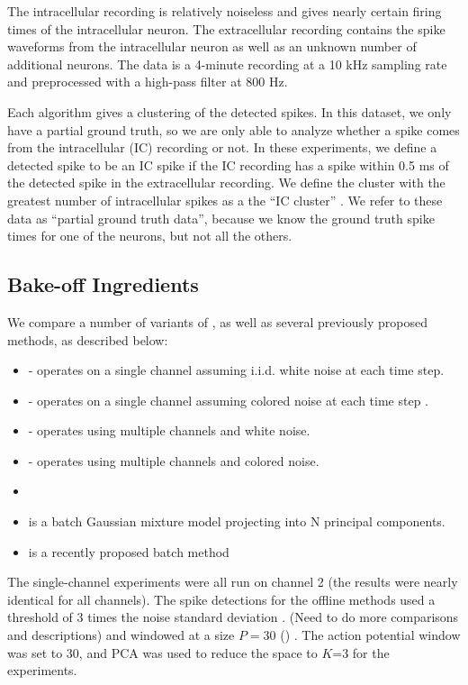 The intracellular recording is relatively noiseless and gives nearly certain firing times of the intracellular neuron.  The extracellular recording contains the spike waveforms from the intracellular neuron as well as an unknown number of additional neurons.  The data is a 4-minute recording at a 10 kHz sampling rate and preprocessed with a high-pass filter at 800 Hz. 

Each algorithm gives a clustering of the detected spikes.  In this dataset, we only have a partial ground truth, so we are only able to analyze whether a spike comes from the intracellular (IC) recording or not.  In these experiments, we define a detected spike to be an IC spike if the IC recording has a spike within 0.5 ms  of the detected spike in the extracellular recording.  We define the cluster with the greatest number of intracellular spikes as a the ``IC cluster'' .   We refer to these data as ``partial ground truth data'', because we know the ground truth spike times for one of the neurons, but not all the others.  

\subsection{Bake-off Ingredients}

We compare a number of variants of \smug, as well as several previously proposed methods, as described below:
\begin{itemize}\itemsep0pt
	\item \smug- operates on a single channel assuming i.i.d. white noise at each time step.
	\item \smug- operates on a single channel assuming colored noise at each time step .
	\item \smug- operates using multiple channels and white noise.
	\item \smug- operates using multiple channels and colored noise.
	\item {}
	\item {} is a batch Gaussian mixture model projecting into N principal components. 
	\item {} is a recently proposed batch method
\end{itemize}
% 
% 
The single-channel experiments were all run on channel 2 (the results were nearly identical for all channels).  The spike detections for the offline methods used a threshold of 3 times the noise standard deviation \cite{Lewicki}. (Need to do more comparisons and descriptions) and windowed at a size $P=30$ () .  The action potential window was set to 30, and PCA was used to reduce the space to $K$=3 for the experiments. 

